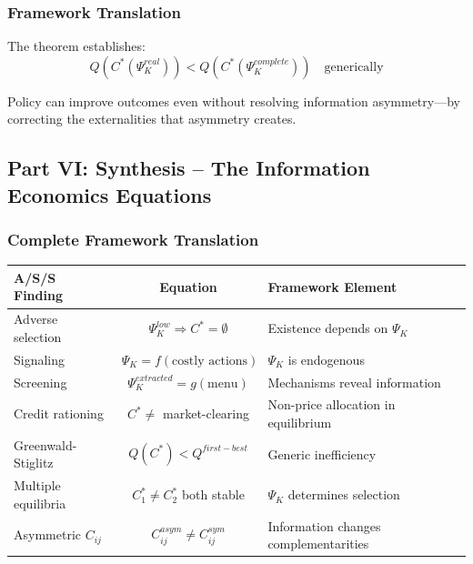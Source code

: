 \subsubsection{Framework Translation}

The theorem establishes:
\begin{equation}
Q(C^*(\Psi_K^{real})) < Q(C^*(\Psi_K^{complete})) \quad \text{generically}
\end{equation}

Policy can improve outcomes even without resolving information asymmetry—by 
correcting the externalities that asymmetry creates.

\subsection{Part VI: Synthesis – The Information Economics Equations}

\subsubsection{Complete Framework Translation}

\begin{center}
\renewcommand{\arraystretch}{1.5}
\begin{tabular}{|l|c|l|}
\hline
\textbf{A/S/S Finding} & \textbf{Equation} & \textbf{Framework Element} \\
\hline
Adverse selection & $\Psi_K^{low} \Rightarrow C^* = \emptyset$ & Existence depends on $\Psi_K$ \\
\hline
Signaling & $\Psi_K = f(\text{costly actions})$ & $\Psi_K$ is endogenous \\
\hline
Screening & $\Psi_K^{extracted} = g(\text{menu})$ & Mechanisms reveal information \\
\hline
Credit rationing & $C^* \neq$ market-clearing & Non-price allocation in equilibrium \\
\hline
Greenwald-Stiglitz & $Q(C^*) < Q^{first-best}$ & Generic inefficiency \\
\hline
Multiple equilibria & $C^*_1 \neq C^*_2$ both stable & $\Psi_K$ determines selection \\
\hline
Asymmetric $C_{ij}$ & $C_{ij}^{asym} \neq C_{ij}^{sym}$ & Information changes complementarities \\
\hline
\end{tabular}
\end{center}

